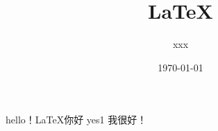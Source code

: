 \documentclass[UTF8]{ctexart}
\title{LaTeX}
\author{xxx}
\date{\today}
\begin{document}
hello！LaTeX你好
yes1
我很好！
\end{document}
